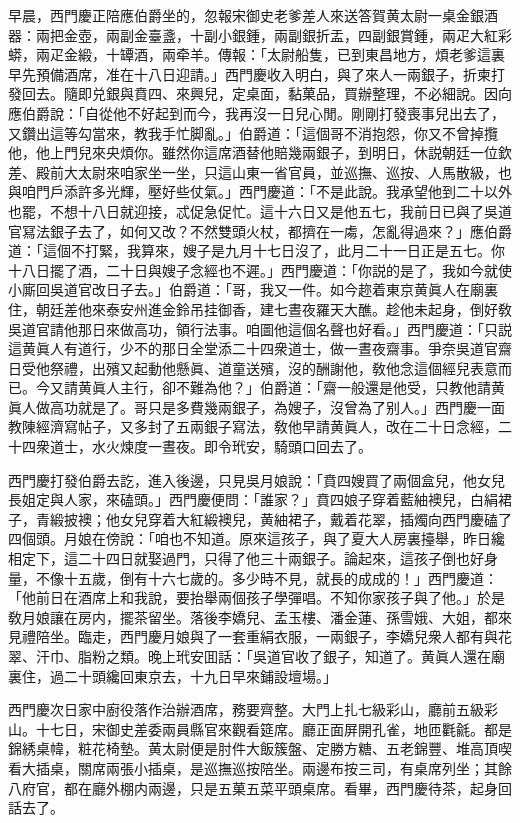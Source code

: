 早晨，西門慶正陪應伯爵坐的，忽報宋御史老爹差人來送答賀黄太尉一桌金銀酒器：兩把金壺，兩副金臺盞，十副小銀鍾，兩副銀折盂，四副銀賞鍾，兩疋大紅彩蟒，兩疋金緞，十罈酒，兩牵羊。傳報：「太尉船隻，已到東昌地方，煩老爹這裏早先預備酒席，准在十八日迎請。」西門慶收入明白，與了來人一兩銀子，折柬打發回去。隨即兑銀與賁四、來興兒，定桌面，黏菓品，買辦整理，不必細說。因向應伯爵說：「自從他不好起到而今，我再沒一日兒心閒。剛剛打發喪事兒出去了，又鑽出這等勾當來，教我手忙脚亂。」伯爵道：「這個哥不消抱怨，你又不曾掉攬他，他上門兒來央煩你。雖然你這席酒替他賠幾兩銀子，到明日，休説朝廷一位欽差、殿前大太尉來咱家坐一坐，只這山東一省官員，並巡撫、巡按、人馬散級，也與咱門戶添許多光輝，壓好些仗氣。」西門慶道：「不是此說。我承望他到二十以外也罷，不想十八日就迎接，忒促急促忙。這十六日又是他五七，我前日已與了吳道官冩法銀子去了，如何又改？不然雙頭火杖，都擠在一䖏，怎亂得過來？」應伯爵道：「這個不打緊，我算來，嫂子是九月十七日沒了，此月二十一日正是五七。你十八日擺了酒，二十日與嫂子念經也不遲。」西門慶道：「你説的是了，我如今就使小廝回吳道官改日子去。」伯爵道：「哥，我又一件。如今趂着東京黄眞人在廟裏住，朝廷差他來泰安州進金鈴吊挂御香，建七晝夜羅天大醮。趁他未起身，倒好敎吳道官請他那日來做高功，領行法事。咱圖他這個名聲也好看。」西門慶道：「只説這黄眞人有道行，少不的那日全堂添二十四衆道士，做一晝夜齋事。爭奈吳道官齋日受他祭禮，出殯又起動他懸眞、道童送殯，沒的酬謝他，敎他念這個經兒表意而已。今又請黄眞人主行，卻不難為他？」伯爵道：「齋一般還是他受，只教他請黄眞人做高功就是了。哥只是多費幾兩銀子，為嫂子，沒曾為了别人。」西門慶一面教陳經濟寫帖子，又多封了五兩銀子寫法，敎他早請黄眞人，改在二十日念經，二十四衆道士，水火煉度一晝夜。即令玳安，騎頭口回去了。

西門慶打發伯爵去訖，進入後邊，只見吳月娘說：「賁四嫂買了兩個盒兒，他女兒長姐定與人家，來磕頭。」西門慶便問：「誰家？」賁四娘子穿着藍紬襖兒，白絹裙子，青緞披襖；他女兒穿着大紅緞襖兒，黄紬裙子，戴着花翠，插燭向西門慶磕了四個頭。月娘在傍說：「咱也不知道。原來這孩子，與了夏大人房裏擡舉，昨日纔相定下，這二十四日就娶過門，只得了他三十兩銀子。論起來，這孩子倒也好身量，不像十五歲，倒有十六七歲的。多少時不見，就長的成成的！」西門慶道：「他前日在酒席上和我說，要抬舉兩個孩子學彈唱。不知你家孩子與了他。」於是敎月娘讓在房内，擺茶留坐。落後李嬌兒、孟玉樓、潘金蓮、孫雪娥、大姐，都來見禮陪坐。臨走，西門慶月娘與了一套重絹衣服，一兩銀子，李嬌兒衆人都有與花翠、汗巾、脂粉之類。晚上玳安囬話：「吳道官收了銀子，知道了。黄眞人還在廟裏住，過二十頭纔回東京去，十九日早來鋪設壇場。」

西門慶次日家中廚役落作治辦酒席，務要齊整。大門上扎七級彩山，廳前五級彩山。十七日，宋御史差委兩員縣官來觀看筵席。廳正面屏開孔雀，地匝氍毹。都是錦綉桌幃，粧花椅墊。黄太尉便是肘件大飯簇盤、定勝方糖、五老錦豐、堆高頂喫看大插桌，關席兩張小插桌，是巡撫巡按陪坐。兩邊布按三司，有桌席列坐；其餘八府官，都在廳外棚内兩邊，只是五菓五菜平頭桌席。看畢，西門慶待茶，起身回話去了。

